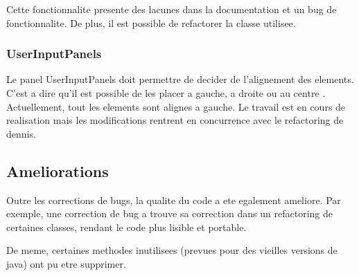 Cette fonctionnalite presente des lacunes dans la documentation \cite{IZPACK-224} et un bug de fonctionnalite\cite{IZPACK-281}. De plus, il est possible de refactorer la classe utilisee\cite{IZPACK-307}.
\subsubsection{UserInputPanels}
Le panel UserInputPanels doit permettre de decider de l'alignement des elements. C'est a dire qu'il est possible de les placer a gauche, a droite ou au centre \cite{IZPACK-176}. Actuellement, tout les elements sont alignes a gauche. Le travail est en cours de realisation mais les modifications rentrent en concurrence avec le refactoring de dennis.


\subsection{Ameliorations}
Outre les corrections de bugs, la qualite du code a ete egalement ameliore. Par exemple, une correction de bug \cite{IZPACK-3xx} a trouve sa correction dans un refactoring de certaines classes, rendant le code plus lisible et portable.

De meme, certaines methodes inutilisees \cite{IZPACK-3xx} (prevues pour des vieilles versions de java) ont pu etre supprimer.